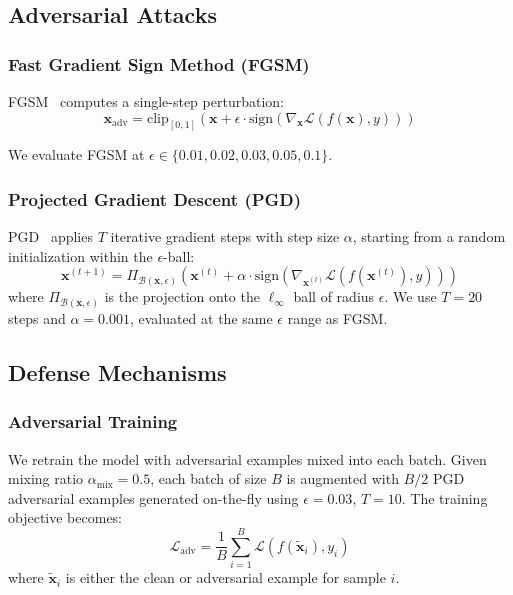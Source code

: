 \documentclass[conference]{IEEEtran}
\newcommand{\x}{\mathbf{x}}
\newcommand{\grad}{\nabla}
\newcommand{\loss}{\mathcal{L}}
\begin{document}
\subsection{Adversarial Attacks}

\subsubsection{Fast Gradient Sign Method (FGSM)}

FGSM~\cite{goodfellow2014fgsm} computes a single-step perturbation:
\begin{equation}
    \x_{\text{adv}} = \text{clip}_{[0,1]}\left(\x + \epsilon \cdot \text{sign}\left(\grad_\x \loss(f(\x), y)\right)\right)
\end{equation}

We evaluate FGSM at $\epsilon \in \{0.01, 0.02, 0.03, 0.05, 0.1\}$.

\subsubsection{Projected Gradient Descent (PGD)}

PGD~\cite{madry2018pgd} applies $T$ iterative gradient steps with step size $\alpha$, starting from a random initialization within the $\epsilon$-ball:
\begin{equation}
    \x^{(t+1)} = \Pi_{\mathcal{B}(\x, \epsilon)}\left(\x^{(t)} + \alpha \cdot \text{sign}\left(\grad_{\x^{(t)}} \loss(f(\x^{(t)}), y)\right)\right)
\end{equation}
where $\Pi_{\mathcal{B}(\x, \epsilon)}$ is the projection onto the $\ell_\infty$ ball of radius $\epsilon$. We use $T=20$ steps and $\alpha = 0.001$, evaluated at the same $\epsilon$ range as FGSM.

\subsection{Defense Mechanisms}

\subsubsection{Adversarial Training}

We retrain the model with adversarial examples mixed into each batch. Given mixing ratio $\alpha_{\text{mix}} = 0.5$, each batch of size $B$ is augmented with $B/2$ PGD adversarial examples generated on-the-fly using $\epsilon=0.03$, $T=10$. The training objective becomes:
\begin{equation}
    \loss_{\text{adv}} = \frac{1}{B}\sum_{i=1}^{B} \loss(f(\tilde{\x}_i), y_i)
\end{equation}
where $\tilde{\x}_i$ is either the clean or adversarial example for sample $i$.
\end{document}
